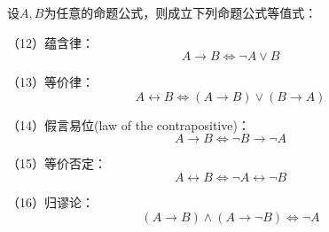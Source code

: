 \begin{thm}[基本的命题公式等值式III]
\label{prop-dengzhi-gongshi-3}
设$A,B$为任意的命题公式，则成立下列命题公式等值式：

（12）蕴含律：
$$A\rightarrow B\Leftrightarrow\neg A\vee B$$

（13）等价律：
$$A\leftrightarrow B\Leftrightarrow (A\rightarrow B)\vee(B\rightarrow A)$$

（14）假言易位(law of the contrapositive)：
$$A\rightarrow B\Leftrightarrow\neg B\rightarrow\neg A$$

（15）等价否定：
$$A\leftrightarrow B\Leftrightarrow\neg A\leftrightarrow\neg B$$

（16）归谬论：
$$(A\rightarrow B)\wedge(A\rightarrow\neg B)\Leftrightarrow\neg A$$
\end{thm}
